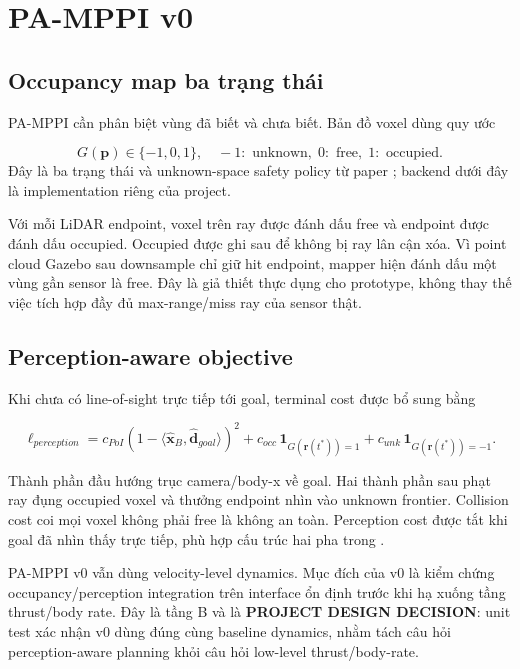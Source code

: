 \documentclass[11pt,a4paper]{article}
\newcommand{\vect}[1]{\bm{#1}}
\begin{document}
\section{PA-MPPI v0}

\subsection{Occupancy map ba trạng thái}

PA-MPPI cần phân biệt vùng đã biết và chưa biết. Bản đồ voxel dùng quy ước

\begin{equation}
G(\vect p) \in \{-1,0,1\},
\quad
-1:\text{ unknown},\;0:\text{ free},\;1:\text{ occupied}.
\end{equation}
Đây là ba trạng thái và unknown-space safety policy từ paper
\cite{zhai2026pamppi}; backend dưới đây là implementation riêng của project.

Với mỗi LiDAR endpoint, voxel trên ray được đánh dấu free và endpoint được đánh
dấu occupied. Occupied được ghi sau để không bị ray lân cận xóa. Vì point cloud
Gazebo sau downsample chỉ giữ hit endpoint, mapper hiện đánh dấu một vùng gần
sensor là free. Đây là giả thiết thực dụng cho prototype, không thay thế việc
tích hợp đầy đủ max-range/miss ray của sensor thật.

\subsection{Perception-aware objective}

Khi chưa có line-of-sight trực tiếp tới goal, terminal cost được bổ sung bằng

\begin{equation}
\ell_{perception} = c_{PoI}(1-\langle \hat{\vect x}_B,
\hat{\vect d}_{goal}\rangle)^2
+ c_{occ}\,\bm{1}_{G(\vect r(t^*))=1}
+ c_{unk}\,\bm{1}_{G(\vect r(t^*))=-1}.
\end{equation}

Thành phần đầu hướng trục camera/body-x về goal. Hai thành phần sau phạt ray
đụng occupied voxel và thưởng endpoint nhìn vào unknown frontier. Collision
cost coi mọi voxel không phải free là không an toàn. Perception cost được tắt
khi goal đã nhìn thấy trực tiếp, phù hợp cấu trúc hai pha trong
\cite{zhai2026pamppi}.

PA-MPPI v0 vẫn dùng velocity-level dynamics. Mục đích của v0 là kiểm chứng
occupancy/perception integration trên interface ổn định trước khi hạ xuống tầng
thrust/body rate.
Đây là tầng B và là \textbf{PROJECT DESIGN DECISION}: unit test xác nhận v0 dùng
đúng cùng baseline dynamics, nhằm tách câu hỏi perception-aware planning khỏi
câu hỏi low-level thrust/body-rate.
\end{document}
